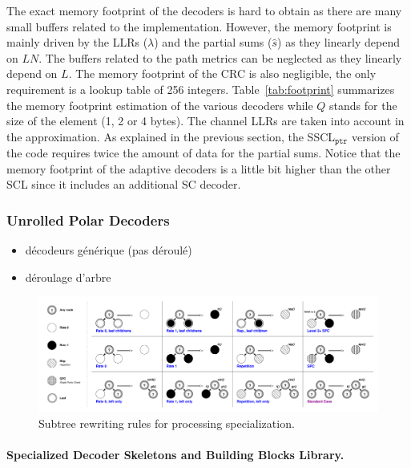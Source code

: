 The exact memory footprint of the decoders is hard to obtain as there are many
small buffers related to the implementation. However, the memory footprint is
mainly driven by the LLRs ($\lambda$) and the partial sums ($\hat{s}$) as they
linearly depend on $LN$. The buffers related to the path metrics can be
neglected as they linearly depend on $L$. The memory footprint of the CRC is
also negligible, the only requirement is a lookup table of 256 integers.
Table~\ref{tab:footprint} summarizes the memory footprint estimation of the
various decoders while $Q$ stands for the size of the element (1, 2 or 4 bytes).
The channel LLRs are taken into account in the approximation. As explained in
the previous section, the SSCL$_{\texttt{ptr}}$ version of the code requires
twice the amount of data for the partial sums. Notice that the memory footprint
of the adaptive decoders is a little bit higher than the other SCL since it
includes an additional SC decoder.

\subsubsection{Unrolled Polar Decoders}

\begin{itemize}
  \item décodeurs générique (pas déroulé)
  \item déroulage d'arbre
\end{itemize}

\begin{figure}
  \centering
  \includegraphics[width=1.0\textwidth]{polar/patterns}
  \caption{Subtree rewriting rules for processing specialization.}
  \label{fig:polar_patterns}
\end{figure}

\paragraph{Specialized Decoder Skeletons and Building Blocks Library.}

